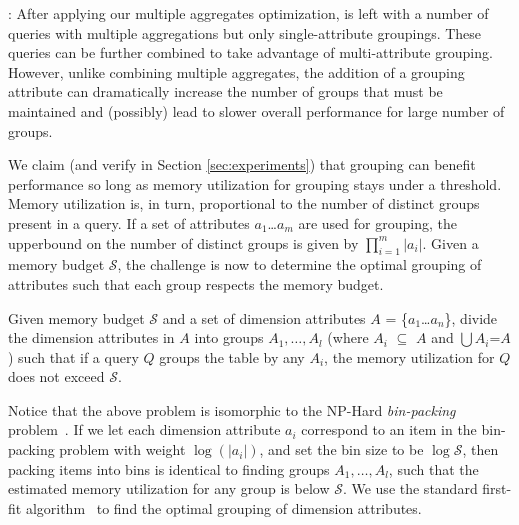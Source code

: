 
:
After applying our multiple aggregates optimization, \SeeDB is left with a number of 
queries with multiple aggregations but only single-attribute groupings.
These queries can be further combined to take advantage of multi-attribute grouping.
However, unlike combining multiple aggregates, the addition of a grouping attribute can 
dramatically increase the number of groups that must be maintained and (possibly)
lead to slower overall performance for large number of groups.

We claim (and verify in Section \ref{sec:experiments}) that grouping can benefit 
performance so long as memory utilization for grouping stays under a threshold.
Memory utilization is, in turn, proportional to the number of distinct groups 
present in a query.
If a set of attributes $a_1$\ldots$a_m$ are used for grouping, the upperbound on the 
number of distinct groups is given by $\prod_{i=1}^m |a_i|$. 
Given a memory budget $\mathcal{S}$, the challenge is now to determine the optimal grouping
of attributes such that each group respects the memory budget.
\vspace{-5pt}
\begin{problem}
Given memory budget $\mathcal{S}$ and a set of dimension attributes $A$ = \{$a_1$\ldots$a_n$\}, 
divide the dimension attributes in $A$ into groups $A_1, \ldots, A_l$ (where $A_i$ $\subseteq$ $A$ 
and $\bigcup A_i$=$A$) such that if a query $Q$ groups the table by any $A_i$, 
the memory utilization for $Q$ does not exceed $\mathcal{S}$.
\vspace{-5pt}
\end{problem}

Notice that the above problem is isomorphic to the NP-Hard {\em bin-packing} problem~\cite{garey}.
If we let each dimension attribute
$a_i$ correspond to an item in the bin-packing problem with weight $\log (|a_i|)$,
and set the bin size to be $\log \mathcal{S}$,
then packing items into bins is identical to finding groups $A_1, \ldots, A_l$,
such that the estimated memory utilization for any group is below $\mathcal{S}$.
We use the standard first-fit algorithm~\cite{first-fit} to find the optimal
grouping of dimension attributes.


